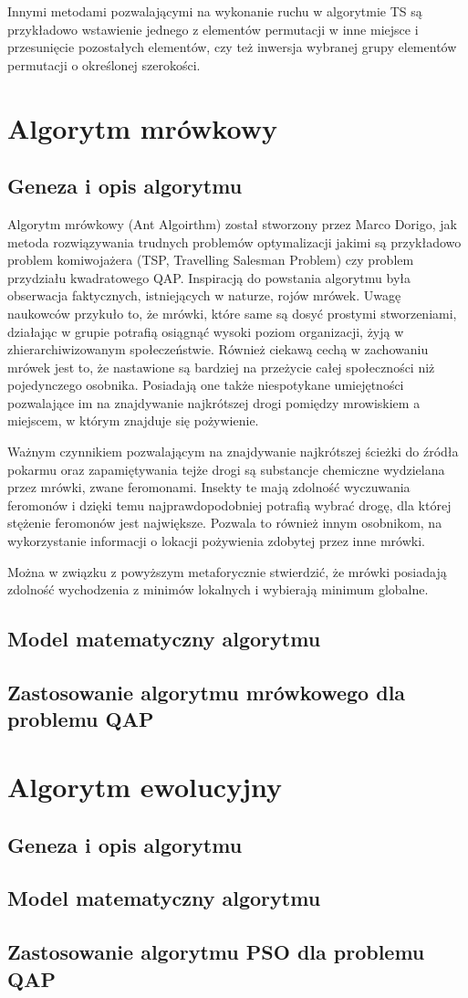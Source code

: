 Innymi metodami pozwalającymi na wykonanie ruchu w algorytmie TS są przykładowo wstawienie jednego z elementów permutacji w inne miejsce i przesunięcie pozostałych elementów, czy też inwersja wybranej grupy elementów permutacji o określonej szerokości.
\section{Algorytm mrówkowy}
\label{sec:mrowka}
\subsection{Geneza i opis algorytmu}
Algorytm mrówkowy (Ant Algoirthm) został stworzony przez Marco Dorigo, jak metoda rozwiązywania trudnych problemów optymalizacji jakimi są przykładowo problem komiwojażera (TSP, Travelling Salesman Problem) czy problem przydziału kwadratowego QAP. Inspiracją do powstania algorytmu była obserwacja faktycznych, istniejących w naturze, rojów mrówek. Uwagę naukowców przykuło to, że mrówki, które same są dosyć prostymi stworzeniami, działając w grupie potrafią osiągnąć wysoki poziom organizacji, żyją w zhierarchiwizowanym społeczeństwie. Również ciekawą cechą w zachowaniu mrówek jest to, że nastawione są bardziej na przeżycie całej społeczności niż pojedynczego osobnika. Posiadają one także niespotykane umiejętności pozwalające im na znajdywanie najkrótszej drogi pomiędzy mrowiskiem a     miejscem, w którym znajduje się pożywienie.

Ważnym czynnikiem pozwalającym na znajdywanie najkrótszej ścieżki do źródła pokarmu oraz zapamiętywania tejże drogi są substancje chemiczne wydzielana przez mrówki, zwane feromonami. Insekty te mają zdolność wyczuwania feromonów i dzięki temu najprawdopodobniej potrafią wybrać drogę, dla której stężenie feromonów jest największe. Pozwala to również innym osobnikom, na wykorzystanie informacji o lokacji pożywienia zdobytej przez inne mrówki.

Można w związku z powyższym metaforycznie stwierdzić, że mrówki posiadają zdolność wychodzenia z minimów lokalnych i wybierają minimum globalne.

\subsection{Model matematyczny algorytmu}
\subsection{Zastosowanie algorytmu mrówkowego dla problemu QAP}

\section{Algorytm ewolucyjny}
\label{sec:AE}
\subsection{Geneza i opis algorytmu}
\subsection{Model matematyczny algorytmu}
\subsection{Zastosowanie algorytmu PSO dla problemu QAP}